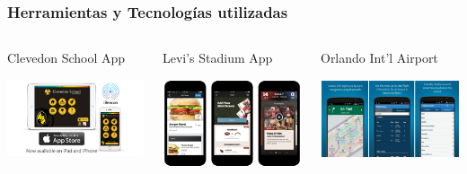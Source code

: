 \begin{frame}
	\frametitle{Herramientas y Tecnologías utilizadas}
		\begin{columns}
			\begin{column}{0.3\textwidth}
				Clevedon School App
				\vspace{3mm}
				\vfill 
					\begin{center}
						\includegraphics[width=0.8\linewidth]{Images/ClevedonApp}
					\end{center}
			\end{column}
			\begin{column}{0.3\textwidth}
				Levi's Stadium App
				\vspace{3mm}
				\vfill 
					\begin{center}
						\includegraphics[width=0.8\linewidth]{Images/LevisStadium}
					\end{center}
			\end{column}
			\begin{column}{0.3\textwidth}
				Orlando Int'l Airport
				\vspace{3mm}
				\vfill 
					\begin{center}
						\includegraphics[width=0.8\linewidth]{Images/orlandoAirport}

\end{center}
\end{column}
\end{columns}
\end{frame}
